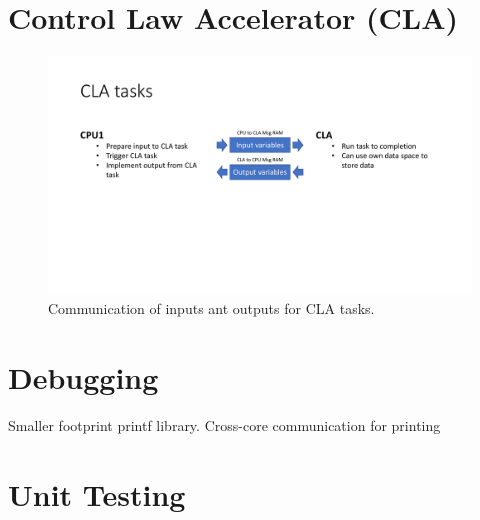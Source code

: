 \section{Control Law Accelerator (CLA)}

\begin{figure}[H]
    \centering \includegraphics[width=1.0\textwidth]{./figures/CLA_communication.pdf}
    \caption{Communication of inputs ant outputs for CLA tasks.}
    \label{fig:CLA_communication}
\end{figure}

\section{Debugging}

Smaller footprint printf library. Cross-core communication for printing

\section{Unit Testing}
